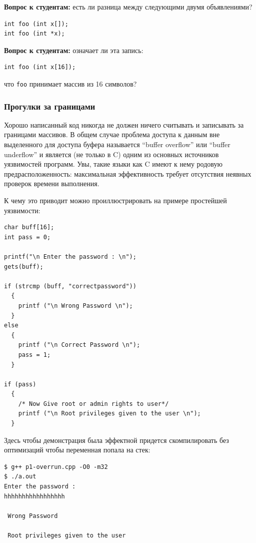 \documentclass[a4paper,12pt,oneside]{article}
\newif\ifanswers
\begin{document}
\textbf{Вопрос к студентам:} есть ли разница между следующими двумя объявлениями?

\begin{lstlisting}
int foo (int x[]);
int foo (int *x);
\end{lstlisting}

\ifanswers
Ответ: из-за decaying разницы нет.
\fi

\textbf{Вопрос к студентам:} означает ли эта запись:

\begin{lstlisting}
int foo (int x[16]);
\end{lstlisting}

что \lstinline!foo! принимает массив из 16 символов?

\ifanswers
Ответ: нет, здесь \lstinline!foo! принимает любой указатель.
\fi

\subsubsection{Прогулки за границами}

Хорошо написанный код никогда не должен ничего считывать и записывать за границами массивов. В общем случае проблема доступа к данным вне выделенного для доступа буфера называется ``buffer overflow'' или ``buffer underflow'' и является (не только в C) одним из основных источников уязвимостей программ. Увы, такие языки как C имеют к нему родовую предрасположенность: максимальная эффективность требует отсутствия неявных проверок времени выполнения.

К чему это приводит можно проиллюстрировать на примере простейшей уязвимости:

\begin{lstlisting}
char buff[16];
int pass = 0;

printf("\n Enter the password : \n");
gets(buff);

if (strcmp (buff, "correctpassword"))
  {
    printf ("\n Wrong Password \n");
  }
else
  {
    printf ("\n Correct Password \n");
    pass = 1;
  }

if (pass)
  {
    /* Now Give root or admin rights to user*/
    printf ("\n Root privileges given to the user \n");
  }
\end{lstlisting}

Здесь чтобы демонстрация была эффектной придется скомпилировать без оптимизаций чтобы переменная попала на стек:

\begin{verbatim}
$ g++ p1-overrun.cpp -O0 -m32
$ ./a.out
Enter the password : 
hhhhhhhhhhhhhhhhh

 Wrong Password 

 Root privileges given to the user 
\end{verbatim}
\end{document}
